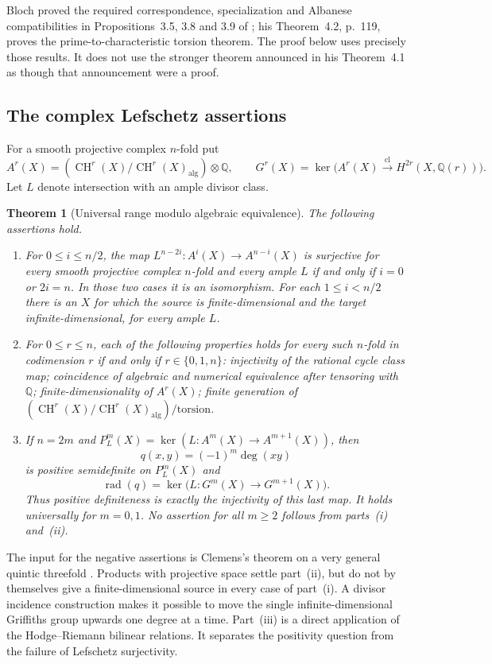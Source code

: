 \documentclass[11pt]{article}
\newcommand{\CH}{\operatorname{CH}}
\newcommand{\cl}{\operatorname{cl}}
\newcommand{\Q}{\mathbb Q}
\newcommand{\alg}{\mathrm{alg}}
\DeclareMathOperator{\rad}{rad}
\newtheorem{theorem}{Theorem}[section]
\theoremstyle{definition}
\theoremstyle{remark}
\begin{document}
Bloch proved the required correspondence, specialization and Albanese compatibilities in Propositions~3.5, 3.8 and 3.9 of \cite[pp.~115, 117--119]{Bloch}; his Theorem~4.2, p.~119, proves the prime-to-characteristic torsion theorem. The proof below uses precisely those results. It does not use the stronger theorem announced in his Theorem~4.1 as though that announcement were a proof.

\subsection{The complex Lefschetz assertions}

For a smooth projective complex $n$-fold put
\[
 A^r(X)=(\CH^r(X)/\CH^r(X)_{\alg})\otimes\Q,
 \qquad G^r(X)=\ker\bigl(A^r(X)\xrightarrow{\cl}H^{2r}(X,\Q(r))\bigr).
\]
Let $L$ denote intersection with an ample divisor class.

\begin{theorem}[Universal range modulo algebraic equivalence]\label{thm:range}
The following assertions hold.
\begin{enumerate}[label=(\roman*)]
\item For $0\leq i\leq n/2$, the map
$L^{n-2i}:A^i(X)\to A^{n-i}(X)$ is surjective for every smooth projective complex $n$-fold and every ample $L$ if and only if $i=0$ or $2i=n$. In those two cases it is an isomorphism. For each $1\leq i<n/2$ there is an $X$ for which the source is finite-dimensional and the target infinite-dimensional, for every ample $L$.
\item For $0\leq r\leq n$, each of the following properties holds for every such $n$-fold in codimension $r$ if and only if $r\in\{0,1,n\}$: injectivity of the rational cycle class map; coincidence of algebraic and numerical equivalence after tensoring with $\Q$; finite-dimensionality of $A^r(X)$; finite generation of $(\CH^r(X)/\CH^r(X)_{\alg})/\mathrm{torsion}$.
\item If $n=2m$ and $P^m_L(X)=\ker(L:A^m(X)\to A^{m+1}(X))$, then
\[
 q(x,y)=(-1)^m\deg(xy)
\]
is positive semidefinite on $P^m_L(X)$ and
\[
 \rad(q)=\ker\bigl(L:G^m(X)\to G^{m+1}(X)\bigr).
\]
Thus positive definiteness is exactly the injectivity of this last map. It holds universally for $m=0,1$. No assertion for all $m\geq2$ follows from parts~(i) and~(ii).
\end{enumerate}
\end{theorem}

The input for the negative assertions is Clemens's theorem on a very general quintic threefold \cite[Theorem~(0.2), equation~(0.1), p.~19]{Clemens}. Products with projective space settle part~(ii), but do not by themselves give a finite-dimensional source in every case of part~(i). A divisor incidence construction makes it possible to move the single infinite-dimensional Griffiths group upwards one degree at a time. Part~(iii) is a direct application of the Hodge--Riemann bilinear relations. It separates the positivity question from the failure of Lefschetz surjectivity.
\end{document}
